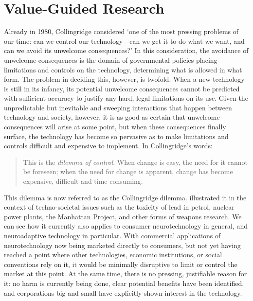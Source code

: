 %
\section*{Value-Guided Research}%

Already in 1980, Collingridge considered `one of the most pressing problems of our time: can we control our technology---can we get it to do what we want, and can we avoid its unwelcome consequences?' In this consideration, the avoidance of unwelcome consequences is the domain of governmental policies placing limitations and controls on the technology, determining what is allowed in what form. The problem in deciding this, however, is twofold. When a new technology is still in its infancy, its potential unwelcome consequences cannot be predicted with sufficient accuracy to justify any hard, legal limitations on its use. Given the unpredictable but inevitable and sweeping interactions that happen between technology and society, however, it is as good as certain that unwelcome consequences will arise at some point, but when these consequences finally surface, the technology has become so pervasive as to make limitations and controls difficult and expensive to implement. In Collingridge's words:

\begin{quote}
    This is the \emph{dilemma of control}. When change is easy, the need for it cannot be foreseen; when the need for change is apparent, change has become expensive, difficult and time consuming.
\end{quote}

This dilemma is now referred to as the Collingridge dilemma.  illustrated it in the context of techno-societal issues such as the toxicity of lead in petrol, nuclear power plants, the Manhattan Project, and other forms of weapons research. We can see how it currently also applies to consumer neurotechnology in general, and neuroadaptive technology in particular. With commercial applications of neurotechnology now being marketed directly to consumers, but not yet having reached a point where other technologies, economic institutions, or social conventions rely on it, it would be minimally disruptive to limit or control the market at this point. At the same time, there is no pressing, justifiable reason for it: no harm is currently being done, clear potential benefits have been identified, and corporations big and small have explicitly shown interest in the technology. 

